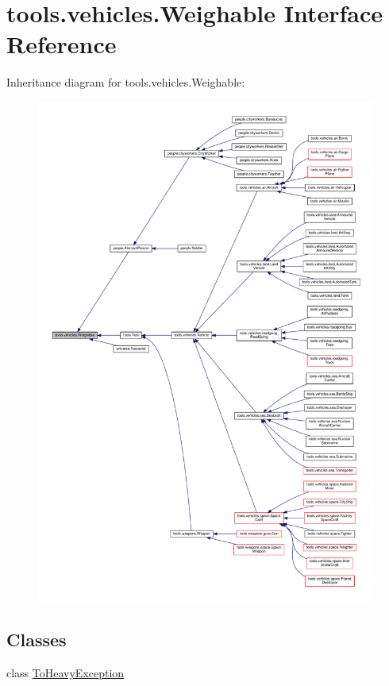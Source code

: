 \hypertarget{interfacetools_1_1vehicles_1_1_weighable}{}\section{tools.\+vehicles.\+Weighable Interface Reference}
\label{interfacetools_1_1vehicles_1_1_weighable}


Inheritance diagram for tools.\+vehicles.\+Weighable\+:
\nopagebreak
\begin{figure}[H]
\begin{center}
\leavevmode
\includegraphics[width=350pt]{interfacetools_1_1vehicles_1_1_weighable__inherit__graph}
\end{center}
\end{figure}
\subsection*{Classes}
\begin{DoxyCompactItemize}
\item 
class \hyperlink{classtools_1_1vehicles_1_1_weighable_1_1_to_heavy_exception}{To\+Heavy\+Exception}
\end{DoxyCompactItemize}
